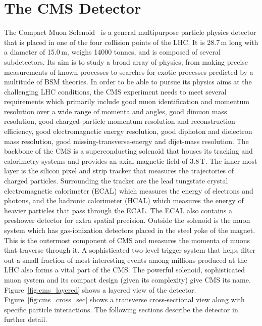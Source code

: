 \section{The CMS Detector}
\label{sec:CMS}
The Compact Muon Solenoid~\cite{cms_exp_ref} is a general multipurpose particle physics detector that is placed in one of the four collision points of the LHC. It is 28.7\,m long with a diameter of 15.0\,m, weighs 14000 tonnes, and is composed of several subdetectors. Its aim is to study a broad array of physics, from making precise measurements of known processes to searches for exotic processes predicted by a multitude of BSM theories. In order to be able to pursue its physics aims at the challenging LHC conditions, the CMS experiment needs to meet several requirements which primarily include good muon identification and momentum resolution over a wide range of momenta and angles, good dimuon mass resolution, good charged-particle momentum resolution and reconstruction efficiency, good electromagnetic energy resolution, good diphoton and dielectron mass resolution, good missing-transverse-energy and dijet-mass resolution.
The backbone of the CMS is a superconducting solenoid that houses its tracking and calorimetry systems and provides an axial magnetic field of 3.8\,T. The inner-most layer is the silicon pixel and strip tracker that measures the trajectories of charged particles. Surrounding the tracker are the lead tungstate crystal electromagnetic calorimeter (ECAL) which measures the energy of electrons and photons, and the hadronic calorimeter (HCAL) which measures the energy of heavier particles that pass through the ECAL. The ECAL also contains a preshower detector for extra spatial precision. Outside the solenoid is the muon system which has gas-ionization detectors placed in the steel yoke of the magnet. This is the outermost component of CMS and measures the momenta of muons that traverse through it. A sophisticated two-level trigger system that helps filter out a small fraction of most interesting events among millions produced at the LHC also forms a vital part of the CMS. The powerful solenoid, sophisticated muon system and its compact design (given its complexity) give CMS its name. Figure~\ref{fig:cms_layered} shows a layered view of the detector. Figure~\ref{fig:cms_cross_sec} shows a transverse cross-sectional view along with specific particle interactions. The following sections describe the detector in further detail.   

